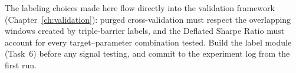The labeling choices made here flow directly into the validation
framework (Chapter~\ref{ch:validation}): purged cross-validation must
respect the overlapping windows created by triple-barrier labels,
and the Deflated Sharpe Ratio must account for every target--parameter
combination tested.
Build the label module (Task~6) before any signal testing, and
commit to the experiment log from the first run.
